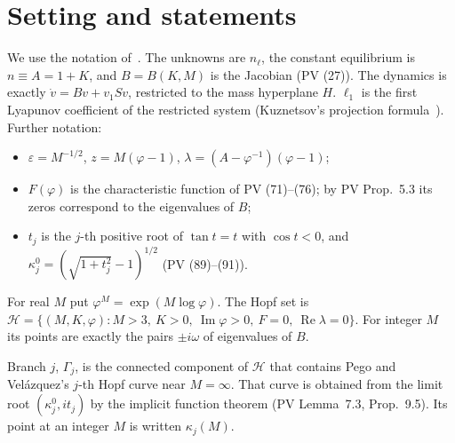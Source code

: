 \documentclass[11pt,a4paper]{report}
\begin{document}
\section{Setting and statements}

We use the notation of~\autocite{Result8,AllM}. The unknowns are \(n_\ell\), the constant equilibrium is \(n\equiv
A=1+K\), and \(B=B(K,M)\) is the Jacobian (PV (27)). The dynamics is exactly \(\dot v=Bv+v_1Sv\), restricted to the
mass hyperplane \(H\). \(\ell_1\) is the first Lyapunov coefficient of the restricted system (Kuznetsov's projection
formula~\autocite{Kuznetsov2004}). Further notation:
\begin{itemize}
\item \(\varepsilon=M^{-1/2}\), \(z=M(\varphi-1)\), \(\lambda=(A-\varphi^{-1})(\varphi-1)\);
\item \(F(\varphi)\) is the characteristic function of PV (71)--(76); by PV Prop.~5.3 its zeros correspond to the
eigenvalues of \(B\);
\item \(t_j\) is the \(j\)-th positive root of \(\tan t=t\) with \(\cos t<0\), and \(\kappa_j^0=(\sqrt{1+t_j^2}-1)^{1/2}\)
(PV (89)--(91)).
\end{itemize}
For real \(M\) put \(\varphi^M=\exp(M\log\varphi)\). The Hopf set is \(\mathcal H=\{(M,K,\varphi):M>3,\ K>0,\
\operatorname{Im}\varphi>0,\ F=0,\ \operatorname{Re}\lambda=0\}\). For integer \(M\) its points are exactly the pairs
\(\pm i\omega\) of eigenvalues of \(B\).

\begin{definition}
Branch \(j\), \(\Gamma_j\), is the connected component of \(\mathcal H\) that contains Pego and Velázquez's
\(j\)-th Hopf curve near \(M=\infty\). That curve is obtained from the limit root \((\kappa_j^0,it_j)\) by the implicit
function theorem (PV Lemma~7.3, Prop.~9.5). Its point at an integer \(M\) is written \(\kappa_j(M)\).
\end{definition}
\end{document}
